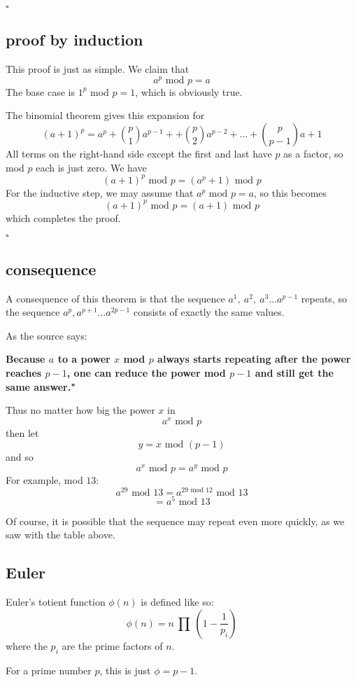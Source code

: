 \documentclass[11pt, oneside]{article}
\begin{document}
$\square$

\subsection*{proof by induction}

This proof is just as simple.  We claim that
\[ a^p  \text{ mod } p = a \]
The base case is $1^p$ mod $p = 1$, which is obviously true.  

The binomial theorem gives this expansion for 
\[  (a+1)^p = a^p + \binom{p}{1} a^{p-1} + + \binom{p}{2} a^{p-2} + \dots + \binom{p}{p-1} a + 1  \]
All terms on the right-hand side except the first and last have $p$ as a factor, so mod $p$ each is just zero.  We have
\[  (a+1)^p \text{ mod } p = (a^p + 1)  \text{ mod } p \]
For the inductive step, we may assume that $a^p  \text{ mod } p = a$, so this becomes
\[ (a+1)^p \text{ mod } p= (a + 1) \text{ mod } p \]
which completes the proof.

$\square$

\subsection*{consequence}
A consequence of this theorem is that the sequence $a^1, \ a^2, \ a^3 \dots a^{p-1}$ repeats, so the sequence $a^{p}, a^{p+1} \dots a^{2p - 1}$ consists of exactly the same values.

As the source says:

\textbf{Because $a$  to a power $x$ mod $p$ always starts repeating after the power reaches $p-1$, one can reduce the power mod $p-1$ and still get the same answer."}

Thus no matter how big the power $x$ in
\[ a^x \text{ mod } p \]
then let
\[ y = x \text{ mod } (p-1) \]
and so
\[ a^x \text{ mod } p = a^{y} \text{ mod } p \]
For example, mod $13$:
\[ a^{29} \text{ mod } 13 = a^{29 \text{ mod } 12} \text{ mod } 13 \]
\[ = a^5  \text{ mod } 13 \]

Of course, it is possible that the sequence may repeat even more quickly, as we saw with the table above.

\subsection*{Euler}
Euler's totient function $\phi(n)$ is defined like so:
\[ \phi(n) = n \ \prod \ (1 - \frac{1}{p_i}) \]
where the $p_i$ are the prime factors of $n$.

For a prime number $p$, this is just $\phi = p - 1$.  
\end{document}
